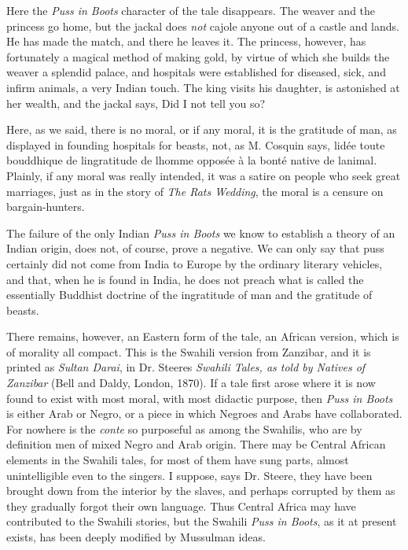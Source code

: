 \documentclass[14pt,a4paper]{memoir}
\begin{document}
Here the \emph{Puss in Boots} character of the tale disappears. The
weaver and the princess go home, but the jackal does \emph{not} cajole
anyone out of a castle and lands. He has made the match, and there he
leaves it. The princess, however, has fortunately a magical method of
making gold, by virtue of which she builds the weaver a splendid palace,
and \textquotesingle hospitals were established for diseased, sick, and
infirm animals,\textquotesingle{} a very Indian touch. The king visits
his daughter, is astonished at her wealth, and the jackal says,
\textquotesingle Did I not tell you so?\textquotesingle{}

Here, as we said, there is no moral, or if any moral, it is the
gratitude of man, as displayed in founding hospitals for beasts, not, as
M. Cosquin says, \textquotesingle l\textquotesingle idée toute
bouddhique de l\textquotesingle ingratitude de l\textquotesingle homme
opposée à la bonté native de l\textquotesingle animal.\textquotesingle{}
Plainly, if any moral was really intended, it was a satire on people who
seek great marriages, just as in the story of \emph{The
Rat\textquotesingle s Wedding}, the moral is a censure on
bargain-hunters.

The failure of the only Indian \emph{Puss in Boots} we know to establish
a theory of an Indian origin, does not, of course, prove a negative. We
can only say that puss certainly did not come from India to Europe by
the ordinary literary vehicles, and that, when he is found in India, he
does not preach what is called the essentially Buddhist doctrine of the
ingratitude of man and the gratitude of beasts.

There remains, however, an Eastern form of the tale, an African version,
which is of morality all compact. This is the Swahili version from
Zanzibar, and it is printed as \emph{Sultan Darai}, in Dr.
Steere\textquotesingle s \emph{Swahili Tales, as told by Natives of
Zanzibar} (Bell and Daldy, London, 1870). If a tale first arose where it
is now found to exist with most moral, with most didactic purpose, then
\emph{Puss in Boots} is either Arab or Negro, or a piece in which
Negroes and Arabs have collaborated. For nowhere is the \emph{conte} so
purposeful as among the Swahilis, who are by definition
\textquotesingle men of mixed Negro and Arab origin.\textquotesingle{}
There may be Central African elements in the Swahili tales, for most of
them have \textquotesingle sung parts,\textquotesingle{} almost
unintelligible even to the singers. \textquotesingle I
suppose,\textquotesingle{} says Dr. Steere, \textquotesingle they have
been brought down from the interior by the slaves, and perhaps corrupted
by them as they gradually forgot their own language.\textquotesingle{}
Thus Central Africa may have contributed to the Swahili stories, but the
Swahili \emph{Puss in Boots}, as it at present exists, has been deeply
modified by Mussulman ideas.
\end{document}
